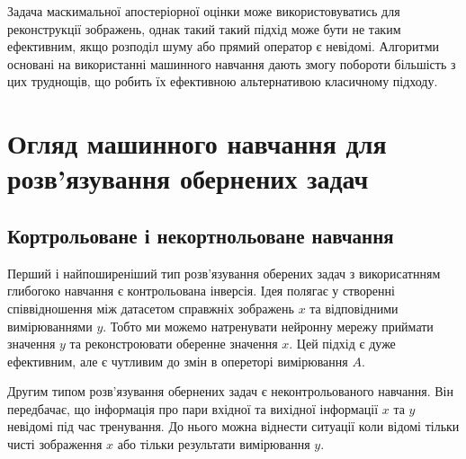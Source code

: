 \documentclass[14pt,a4paper]{extarticle}
\newcounter{e}
\numberwithin{equation}{section}
\numberwithin{figure}{section}
\begin{document}
	
	\begin{comment}
	Його метод оснований на залучені додаткової
	інформації про розв’язок, яка може бути як якісною так і кількісною.

	Наприклад, можна шукати розв’язок максимально близький до деякого
	профілю, тобто, до декого вектора $y$.	
	[0
	. Концепція регуляризації зводиться до
	заміни початкової некоректної задачі на задачу про мінімізацію наступної
	функції: 0 W([,l) = A[ - B + l [ -[ , де l - малий додатній параметр
	регуляризації, який необхідно підібрати певним способом. Якщо розглядати
	не дискретну, а неперервну задачу, тоді W([,l), буде представляти собою не
	функцію, а функціонал, який має назву функціонал Тіхонова.
	\end{comment}

	Задача маскимальної апостеріорної оцінки може використовуватись для реконструкції зображень, однак такий такий підхід може бути не таким ефективним, якщо розподіл шуму або прямий оператор є невідомі. 
	Алгоритми основані на використанні машинного навчання дають змогу побороти більшість з цих труднощів, що робить їх ефективною альтернативою класичному підходу.

	\section{Огляд машинного навчання для розв'язування обернених задач}

	\subsection{Кортрольоване і некортнольоване навчання}
	Перший і найпоширеніший тип розв'язування оберених задач з викорисатнням глибогоко навчання є контрольована інверсія. Ідея полягає у створенні співвідношення між датасетом справжніх зображень $x$ та відповідними вимірюваннями $y$. Тобто ми можемо натренувати нейронну мережу приймати значення $y$ та реконстроювати оберенне значення $x$. Цей підхід є дуже ефективним, але є чутливим до змін в опереторі вимірювання $A$. 
	
	Другим типом розв'язування обернених задач є неконтрольованого навчання. Він передбачає, що інформація про пари вхідної та вихідної інформації $x$ та $y$ невідомі під час тренування. До нього можна віднести ситуації коли відомі тільки чисті зображення $x$ або тільки результати вимірювання $y$.
\end{document}
